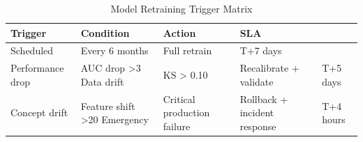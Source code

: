\begin{table}
\caption{Model Retraining Trigger Matrix}
\label{tab:retrain}
\begin{tabular}{llll}
\toprule
Trigger & Condition & Action & SLA \\
\midrule
Scheduled & Every 6 months & Full retrain & T+7 days \\
Performance drop & AUC drop >3%
Data drift & KS > 0.10 & Recalibrate + validate & T+5 days \\
Concept drift & Feature shift >20%
Emergency & Critical production failure & Rollback + incident response & T+4 hours \\
\bottomrule
\end{tabular}
\end{table}
